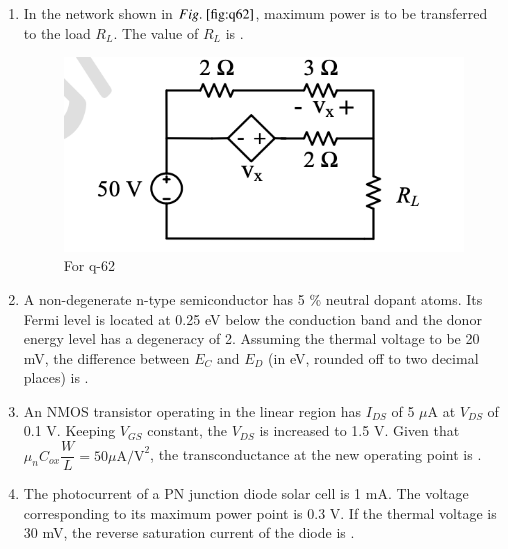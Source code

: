 \documentclass[journal,12pt,onecolumn]{IEEEtran}
\theoremstyle{remark}
\begin{document}
\begin{enumerate}
\item In the network shown in $\figref{fig:q62}$, maximum power is to be transferred to the load $R_L$. The value of $R_L$  is \underline{\hspace{2cm}}.
\begin{figure}[H]
    \centering
    \includegraphics[width=0.5\columnwidth]{q62.png}
    \caption{For q-62}
    \label{fig:q62}
\end{figure}
\hfill{}

\item A non-degenerate n-type semiconductor has 5 \% neutral dopant atoms. Its Fermi level is located at 0.25 eV below the conduction band  and the donor energy level  has a degeneracy of 2. Assuming the thermal voltage to be 20 mV, the difference between $E_C$ and $E_D$ (in eV, rounded off to two decimal places) is \underline{\hspace{2cm}}.

\hfill{}

\item An NMOS transistor operating in the linear region has $I_{DS}$ of 5 $\mu$A at $V_{DS}$ of 0.1 V. Keeping $V_{GS}$ constant, the $V_{DS}$ is increased to 1.5 V. Given that $\mu_n C_{ox} \dfrac{W}{L}= 50 \mu\text{A/V}^2$, the transconductance at the new operating point  is \underline{\hspace{2cm}}.

\hfill{}

\item The photocurrent of a PN junction diode solar cell is 1 mA. The voltage corresponding to its maximum power point is 0.3 V. If the thermal voltage is 30 mV, the reverse saturation current of the diode  is \underline{\hspace{2cm}}.

\hfill{}


















\end{enumerate}
\end{document}
